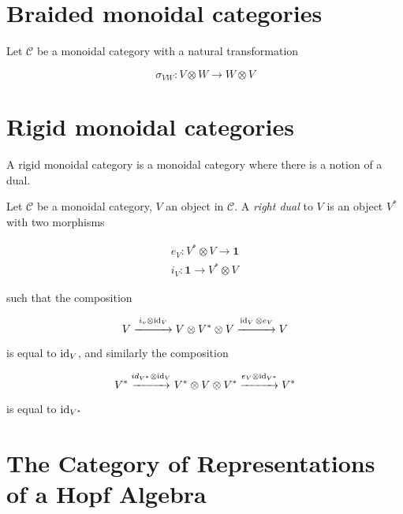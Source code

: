 \section{Braided monoidal categories}

Let $\mathcal{C}$ be a monoidal category with a natural transformation 

\begin{equation}
    \sigma_{VW} : V \otimes W \to W \otimes V
\end{equation}

\section{Rigid monoidal categories}
A rigid monoidal category is a monoidal category where there is a notion of a dual. 

\begin{defn}
    Let $\mathcal{C}$ be a monoidal category, $V$ an object in $\mathcal{C}$. A
    \emph{right dual} to $V$ is an object $V^*$ with two morphisms

    \begin{align}
        e_V: V^* \otimes V \to \mathbf{1}  \\
        i_V: \mathbf{1} \to V^* \otimes V
    \end{align}
\end{defn}

such that the composition

\begin{equation}
    V \stackrel{i_v \otimes \operatorname{id}_V}{\xrightarrow{\hspace*{1cm}}} V \otimes V^*
    \otimes V  \stackrel{\operatorname{id}_V \otimes e_V}{\xrightarrow{\hspace*{1cm}}} V
\end{equation}

is equal to $\operatorname{id}_V$, and similarly the composition

\begin{equation}
    V^* \stackrel{id_{V^*} \otimes \operatorname{id}_V}{\xrightarrow{\hspace*{1cm}}} V^*
    \otimes V \otimes V^*  \stackrel{e_V \otimes
    \operatorname{id}_{V^*}}{\xrightarrow{\hspace*{1cm}}} V^*
\end{equation}

is equal to $\operatorname{id}_{V^*}$


\section{The Category of Representations of a Hopf Algebra}

